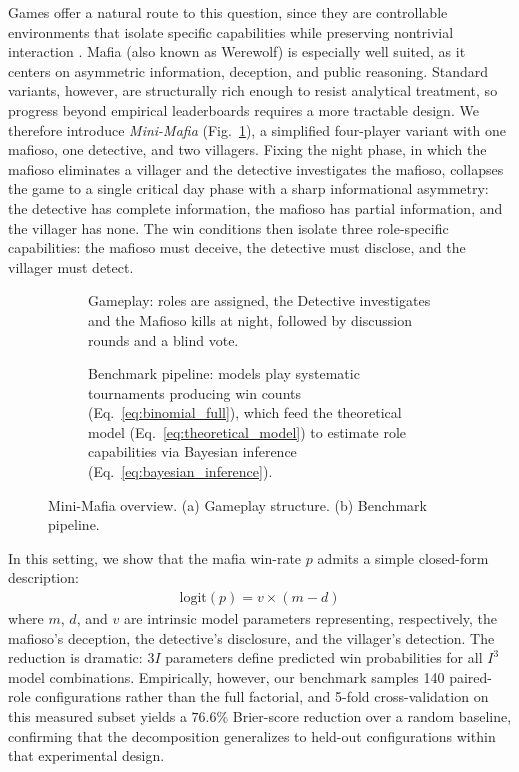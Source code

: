 \documentclass{article}
\begin{document}
Games offer a natural route to this question, since they are controllable environments that isolate specific capabilities while preserving nontrivial interaction \citep{silver2016mastering, huizinga1938homo}. Mafia (also known as Werewolf) is especially well suited, as it centers on asymmetric information, deception, and public reasoning. Standard variants, however, are structurally rich enough to resist analytical treatment, so progress beyond empirical leaderboards requires a more tractable design.
We therefore introduce \textit{Mini-Mafia} (Fig.~\ref{fig:mini-mafia-gameplay}), a simplified four-player variant with one mafioso, one detective, and two villagers. Fixing the night phase, in which the mafioso eliminates a villager and the detective investigates the mafioso, collapses the game to a single critical day phase with a sharp informational asymmetry: the detective has complete information, the mafioso has partial information, and the villager has none. The win conditions then isolate three role-specific capabilities: the mafioso must deceive, the detective must disclose, and the villager must detect.


\begin{figure}[t!]
    \centering
    \begin{subfigure}[t]{0.48\linewidth}
        \centering
        \resizebox{\linewidth}{7cm}{%
        }
        \caption{Gameplay: roles are assigned, the Detective investigates and the Mafioso kills at night, followed by discussion rounds and a blind vote.}
        \label{fig:mini-mafia-gameplay}
    \end{subfigure}
    \hfill
    \begin{subfigure}[t]{0.48\linewidth}
        \centering
        \resizebox{\linewidth}{7cm}{%
        }
        \caption{Benchmark pipeline: models play systematic tournaments producing win counts (Eq.~\ref{eq:binomial_full}), which feed the theoretical model (Eq.~\ref{eq:theoretical_model}) to estimate role capabilities via Bayesian inference (Eq.~\ref{eq:bayesian_inference}).}
        \label{fig:mini-mafia-benchmark}
    \end{subfigure}
    \caption{Mini-Mafia overview. (a) Gameplay structure. (b) Benchmark pipeline.}
    \label{fig:mini-mafia-overview}
\end{figure}


In this setting, we show that the mafia win-rate $p$ admits a simple closed-form description:
\begin{align}
    \text{logit}(p) = v \times (m - d)
\end{align}
where $m$, $d$, and $v$ are intrinsic model parameters representing, respectively, the mafioso's deception, the detective's disclosure, and the villager's detection. The reduction is dramatic: $3I$ parameters define predicted win probabilities for all $I^3$ model combinations. Empirically, however, our benchmark samples 140 paired-role configurations rather than the full factorial, and 5-fold cross-validation on this measured subset yields a $76.6\%$ Brier-score reduction over a random baseline, confirming that the decomposition generalizes to held-out configurations within that experimental design.
\end{document}
